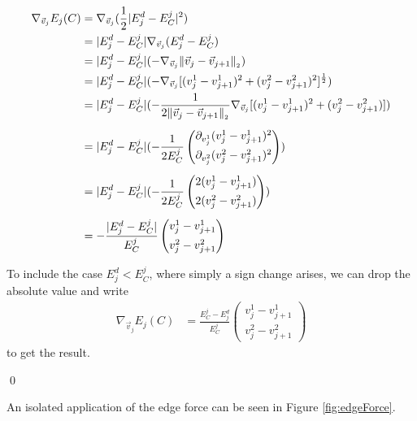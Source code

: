\begin{proposition}
	\begin{align*}
		\nabla_{\vec{v}_{j}} E_{j}(C) &= \nabla_{\vec{v}_j} (\frac{1}{2} |E_j^d - E^j_C|^2) \\
		&= |E_j^d - E^j_C| \nabla_{\vec{v}_j} (E_j^d - E^j_C) \\
		&= |E_j^d - E^j_C| (- \nabla_{\vec{v}_j} \norm[\vec{v}_j - \vec{v}_{j+1}] ) \\
		&= |E_j^d - E^j_C| (- \nabla_{\vec{v}_j} [(v_j^1 - v_{j+1}^1)^2 + (v_j^2 - v_{j+1}^2)^2]^{\frac{1}{2}} ) \\
		&= |E_j^d - E^j_C| (- \frac{1}{2 \norm[\vec{v}_j - \vec{v}_{j+1}]} \nabla_{\vec{v}_j} [(v_j^1 - v_{j+1}^1)^2 + (v_j^2 - v_{j+1}^2)]) \\[0.5em] 
		&= |E_j^d - E^j_C| (- \frac{1}{2 E^j_C} \begin{pmatrix}
			\partial_{v_j^1} (v_j^1 - v_{j+1}^1)^2 \\[0.5em]
			\partial_{v_j^2} (v_j^2 - v_{j+1}^2)^2
		\end{pmatrix}) \\[0.5em]
		&= |E_j^d - E^j_C| (- \frac{1}{2 E^j_C} \begin{pmatrix}
			 2(v_j^1 - v_{j+1}^1) \\[0.5em]
			 2(v_j^2 - v_{j+1}^2)
		\end{pmatrix}) \\[0.5em] 
		&= - \frac{|E_j^d - E^j_C|}{E^j_C} \begin{pmatrix}
			v_j^1 - v_{j+1}^1 \\[0.5em]
			v_j^2 - v_{j+1}^2
	   \end{pmatrix} 
	\end{align*}

	To include the case $E_j^d < E^j_C$, where simply a sign change arises, we can drop the absolute value and write 
	\begin{align*} 
		\nabla_{\vec{v}_j} E_{j}(C) &= \frac{E^j_C - E_j^d}{E^j_C} \begin{pmatrix}
			v_j^1 - v_{j+1}^1 \\[0.5em]
			v_j^2 - v_{j+1}^2
	   \end{pmatrix} 
	\end{align*}
	to get the result.

	\qed  
\end{proposition}

An isolated application of the edge force can be seen in Figure \ref{fig:edgeForce}.  

